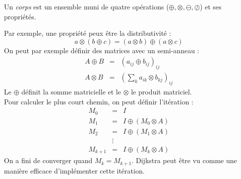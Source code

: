 \begin{mydef}
  Un \emph{corps} est un ensemble muni de quatre opérations ($\oplus,\otimes,\ominus,\oslash$) et ses propriétés.
\end{mydef}

Par exemple, une propriété peux être la distributivité :
$$a\otimes (b \oplus c) = (a \otimes b)\oplus(a \otimes c) $$
On peut par exemple définir des matrices avec un semi-anneau :
\begin{eqnarray}
  A \oplus B &=& (a_{ij} \oplus b_{ij})_{ij}\\
  A \otimes B &=& (\sum_k a_{ik} \otimes b_{kj})_{ij}
\end{eqnarray}
Le $\oplus$ définit la somme matricielle et le $\otimes$ le produit matriciel.\\
Pour calculer le plus court chemin, on peut définir l'itération :
\begin{eqnarray}
  M_0 &=& I\\
  M_1 &=& I \oplus (M_0 \otimes A)\\
  M_2 &=& I \oplus (M_1 \otimes A)\\
   &\vdots &\\
  M_{k+1} &=& I \oplus (M_k \otimes A)
\end{eqnarray}
On a fini de converger quand $M_k = M_{k+1}$. Dijkstra peut être vu comme une manière efficace d'implémenter cette itération.
